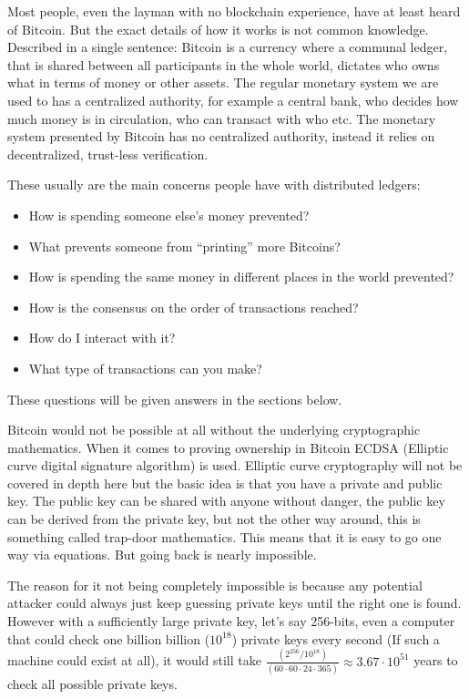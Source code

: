 Most people, even the layman with no blockchain experience, have at least heard
of Bitcoin. But the exact details of how it works is not common knowledge.
Described in a single sentence: Bitcoin is a currency where a communal ledger,
that is shared between all participants in the whole world, dictates who owns what in terms of money or other assets.
The regular monetary system we are
used to has a centralized authority, for example a central bank, who decides
how much money is in circulation, who can transact with who etc. The monetary
system presented by Bitcoin has no centralized authority, instead it relies on
decentralized, trust-less verification.

These usually are the main concerns people have with distributed ledgers:
\begin{itemize}
	\item How is spending someone else's money prevented?
	\item What prevents someone from \enquote{printing} more Bitcoins?
	\item How is spending the same money in different places in the world prevented?
	\item How is the consensus on the order of transactions reached?
	\item How do I interact with it?
	\item What type of transactions can you make?
\end{itemize}

These questions will be given answers in the sections below.

Bitcoin would not be possible at all without the underlying cryptographic
mathematics. When it comes to proving ownership in Bitcoin ECDSA (Elliptic curve
digital signature algorithm)\cite{ecc_def} is used. Elliptic curve cryptography
will not be covered in depth here but the basic idea is that you have a private
and public key. The public key can be shared with anyone without danger, the
public key can be derived from the private key, but not the other way around,
this is something called trap-door mathematics.\cite{ecc_def}\cite{antonopoulos_2017}
This means that it is easy to go one way via equations. But going back is
nearly impossible.

The reason for it not being completely impossible is because any potential
attacker could always just keep guessing private keys until the right one is
found. However with a sufficiently large private key, let's say 256-bits, even a
computer that could check one billion billion ($10^{18}$) private keys every
second (If such a machine could exist at all), it would still take
$\frac{(2^{256} / 10^{18})}{(60\cdot60\cdot24\cdot365)}\approx3.67\cdot10^{51}$
years to check all possible private keys.

